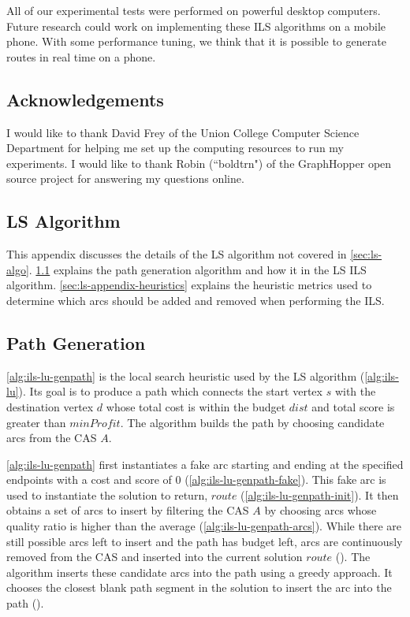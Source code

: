 \documentclass[honors]{union-cs-thesis}
\begin{document}
All of our experimental tests were performed on powerful desktop computers. Future research could work on implementing these ILS algorithms on a mobile phone. With some performance tuning, we think that it is possible to generate routes in real time on a phone.

\subsection{Acknowledgements}
I would like to thank David Frey of the Union College Computer Science Department for helping me set up the computing resources to run my experiments. I would like to thank Robin (``boldtrn") of the GraphHopper open source project for answering my questions online.   


\begin{appendices}

\section{LS Algorithm}
This appendix discusses the details of the LS algorithm not covered in \cref{sec:ls-algo}. \cref{sec:ls-appendix-path} explains the path generation algorithm and how it in the LS ILS algorithm. \cref{sec:ls-appendix-heuristics} explains the heuristic metrics used to determine which arcs should be added and removed when performing the ILS.
\subsection{Path Generation}
\label{sec:ls-appendix-path}
\cref{alg:ils-lu-genpath} is the local search heuristic used by the LS algorithm (\cref{alg:ils-lu}). Its goal is to produce a path which connects the start vertex $s$ with the destination vertex $d$ whose total cost is within the budget $dist$ and total score is greater than $minProfit$. The algorithm builds the path by choosing candidate arcs from the CAS $A$.

\cref{alg:ils-lu-genpath} first instantiates a fake arc starting and ending at the specified endpoints with a cost and score of 0 (\cref{alg:ils-lu-genpath-fake}). This fake arc is used to instantiate the solution to return, $route$ (\cref{alg:ils-lu-genpath-init}). It then obtains a set of arcs to insert by filtering the CAS $A$ by choosing arcs whose quality ratio is higher than the average (\cref{alg:ils-lu-genpath-arcs}). While there are still possible arcs left to insert and the path has budget left, arcs are continuously removed from the CAS and inserted into the current solution $route$ (). The algorithm inserts these candidate arcs into the path using a greedy approach. It chooses the closest blank path segment in the solution to insert the arc into the path ().



\end{appendices}
\end{document}
